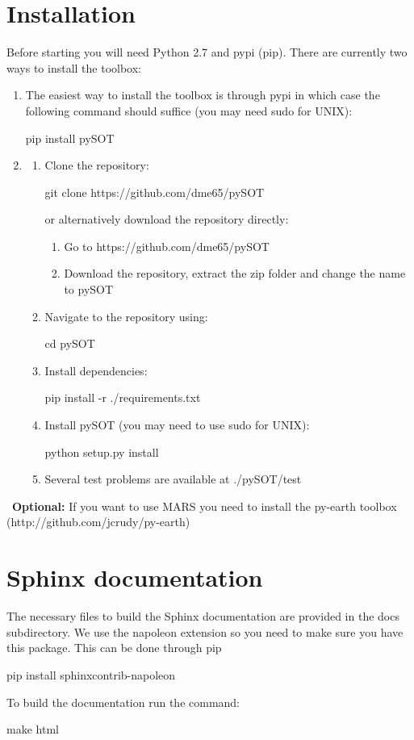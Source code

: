 \documentclass[]{article}
\begin{document}
\section{Installation}
Before starting you will need Python 2.7 and pypi (pip).  There are currently two ways to install the toolbox:
\begin{enumerate}
\item The easiest way to install the toolbox is through pypi in which case the following command should suffice (you may need sudo for UNIX):
\begin{python}
pip install pySOT
\end{python}
\item 
\begin{enumerate}
\item Clone the repository: 
\begin{python}
git clone https://github.com/dme65/pySOT
\end{python} 
or alternatively download the repository directly:
\begin{enumerate}
\item Go to https://github.com/dme65/pySOT
\item Download the repository, extract the zip folder and change the name to pySOT
\end{enumerate}
\item Navigate to the repository using:
\begin{python}
cd pySOT
\end{python} 
\item Install dependencies:
\begin{python}
pip install -r ./requirements.txt
\end{python} 
\item Install pySOT (you may need to use sudo for UNIX):
\begin{python}
python setup.py install
\end{python} 
\item Several test problems are available at ./pySOT/test
\end{enumerate}
\end{enumerate}
\ \newline \textbf{Optional: } If you want to use MARS you need to install the py-earth toolbox (http://github.com/jcrudy/py-earth)  

\section{Sphinx documentation}
The necessary files to build the Sphinx documentation are provided in the docs subdirectory. We use the napoleon extension so you need to make sure you have this package. This can be done through pip
\begin{python}
pip install sphinxcontrib-napoleon
\end{python}
To build the documentation run the command:
\begin{python}
make html
\end{python}
\end{document}
